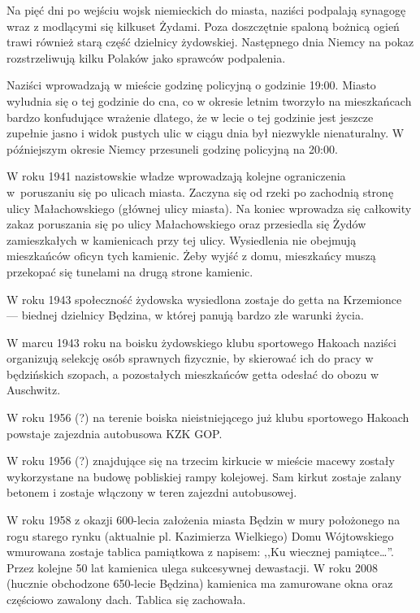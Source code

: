 \documentclass[11pt,a4paper,oneside]{article}
\begin{document}
Na pięć dni po wejściu wojsk niemieckich do miasta, naziści podpalają synagogę
wraz z modlącymi się kilkuset Żydami. Poza doszczętnie spaloną bożnicą ogień
trawi również starą część dzielnicy żydowskiej. Następnego dnia Niemcy na pokaz
rozstrzeliwują kilku Polaków jako sprawców podpalenia.

Naziści wprowadzają w mieście godzinę policyjną o godzinie 19:00. Miasto
wyludnia się o tej godzinie do cna, co w okresie letnim tworzyło na
mieszkańcach bardzo konfudujące wrażenie dlatego, że w lecie o tej godzinie
jest jeszcze zupełnie jasno i widok pustych ulic w ciągu dnia był niezwykle
nienaturalny. W późniejszym okresie Niemcy przesuneli godzinę policyjną na
20:00.

W roku 1941 nazistowskie władze wprowadzają kolejne ograniczenia w~poruszaniu
się po ulicach miasta. Zaczyna się od rzeki po zachodnią stronę ulicy
Małachowskiego (głównej ulicy miasta). Na koniec wprowadza się całkowity zakaz
poruszania się po ulicy Małachowskiego oraz przesiedla się Żydów zamieszkałych
w kamienicach przy tej ulicy. Wysiedlenia nie obejmują mieszkańców oficyn tych
kamienic. Żeby wyjść z domu, mieszkańcy muszą przekopać się tunelami na drugą strone
kamienic.

\newpage
W roku 1943 społeczność żydowska wysiedlona zostaje do getta na Krzemionce
--- biednej dzielnicy Będzina, w której panują bardzo złe warunki życia.

W marcu 1943 roku na boisku żydowskiego klubu sportowego Hakoach naziści
organizują selekcję osób sprawnych fizycznie, by skierować ich do pracy
w będzińskich szopach, a pozostałych mieszkańców getta odesłać do obozu
w Auschwitz.

W roku 1956 (?) na terenie boiska nieistniejącego już klubu sportowego Hakoach
powstaje zajezdnia autobusowa KZK GOP.

W roku 1956 (?) znajdujące się na trzecim kirkucie w mieście macewy zostały
wykorzystane na budowę pobliskiej rampy kolejowej. Sam kirkut zostaje zalany
betonem i zostaje włączony w teren zajezdni autobusowej.

W roku 1958 z okazji 600-lecia założenia miasta Będzin w mury położonego na
rogu starego rynku (aktualnie pl. Kazimierza Wielkiego) Domu Wójtowskiego
wmurowana zostaje tablica pamiątkowa z napisem: ,,Ku wiecznej pamiątce…''. Przez
kolejne 50 lat kamienica ulega sukcesywnej dewastacji. W roku 2008 (hucznie
obchodzone 650-lecie Będzina) kamienica ma zamurowane okna oraz częściowo
zawalony dach. Tablica się zachowała. 
\end{document}
